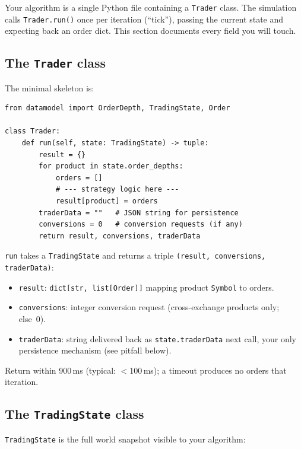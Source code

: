 Your algorithm is a single Python file containing a \texttt{Trader}
class.  The simulation calls \texttt{Trader.run()} once per iteration
(``tick''), passing the current state and expecting back an order dict.
This section documents every field you will touch.

\subsection{The \texttt{Trader} class}

The minimal skeleton is:

\begin{lstlisting}[caption={Minimal \texttt{Trader} skeleton.},
  label={lst:trader_skeleton}]
from datamodel import OrderDepth, TradingState, Order

class Trader:
    def run(self, state: TradingState) -> tuple:
        result = {}
        for product in state.order_depths:
            orders = []
            # --- strategy logic here ---
            result[product] = orders
        traderData = ""   # JSON string for persistence
        conversions = 0   # conversion requests (if any)
        return result, conversions, traderData
\end{lstlisting}

\texttt{run} takes a \texttt{TradingState} and returns a triple
\texttt{(result, conversions, traderData)}:

\begin{itemize}
  \item \texttt{result}: \texttt{dict[str, list[Order]]} mapping product
  \texttt{Symbol} to orders.
  \item \texttt{conversions}: integer conversion request (cross-exchange
  products only; else~0).
  \item \texttt{traderData}: string delivered back as
  \texttt{state.traderData} next call, your only persistence mechanism
  (see pitfall below).
\end{itemize}

Return within 900\,ms (typical: $<$100\,ms); a timeout produces no
orders that iteration.

\subsection{The \texttt{TradingState} class}
\label{sec:tradingstate}

\texttt{TradingState} is the full world snapshot visible to your
algorithm:

